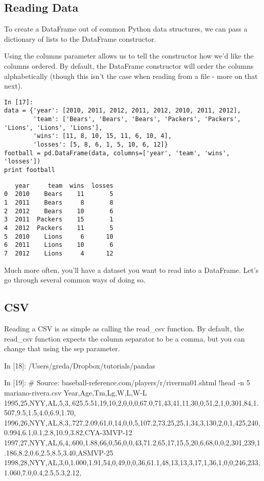 \subsection{Reading Data}

To create a DataFrame out of common Python data structures, we can pass a dictionary of lists to the DataFrame constructor.

Using the columns parameter allows us to tell the constructor how we'd like the columns ordered. By default, the DataFrame constructor will order the columns alphabetically (though this isn't the case when reading from a file - more on that next).

\begin{framed}
\begin{verbatim}
In [17]:
data = {'year': [2010, 2011, 2012, 2011, 2012, 2010, 2011, 2012],
        'team': ['Bears', 'Bears', 'Bears', 'Packers', 'Packers', 'Lions', 'Lions', 'Lions'],
        'wins': [11, 8, 10, 15, 11, 6, 10, 4],
        'losses': [5, 8, 6, 1, 5, 10, 6, 12]}
football = pd.DataFrame(data, columns=['year', 'team', 'wins', 'losses'])
print football
\end{verbatim}
\end{framed}
\begin{verbatim}
   year     team  wins  losses
0  2010    Bears    11       5
1  2011    Bears     8       8
2  2012    Bears    10       6
3  2011  Packers    15       1
4  2012  Packers    11       5
5  2010    Lions     6      10
6  2011    Lions    10       6
7  2012    Lions     4      12
\end{verbatim}


Much more often, you'll have a dataset you want to read into a DataFrame. Let's go through several common ways of doing so.

\subsection{CSV}

Reading a CSV is as simple as calling the read_csv function. By default, the read_csv function expects the column separator to be a comma, but you can change that using the sep parameter.

In [18]:
/Users/greda/Dropbox/tutorials/pandas

In [19]:
# Source: baseball-reference.com/players/r/riverma01.shtml
!head -n 5 mariano-rivera.csv
Year,Age,Tm,Lg,W,L,W-L%
1995,25,NYY,AL,5,3,.625,5.51,19,10,2,0,0,0,67.0,71,43,41,11,30,0,51,2,1,0,301,84,1.507,9.5,1.5,4.0,6.9,1.70,
1996,26,NYY,AL,8,3,.727,2.09,61,0,14,0,0,5,107.2,73,25,25,1,34,3,130,2,0,1,425,240,0.994,6.1,0.1,2.8,10.9,3.82,CYA-3MVP-12
1997,27,NYY,AL,6,4,.600,1.88,66,0,56,0,0,43,71.2,65,17,15,5,20,6,68,0,0,2,301,239,1.186,8.2,0.6,2.5,8.5,3.40,ASMVP-25
1998,28,NYY,AL,3,0,1.000,1.91,54,0,49,0,0,36,61.1,48,13,13,3,17,1,36,1,0,0,246,233,1.060,7.0,0.4,2.5,5.3,2.12,

